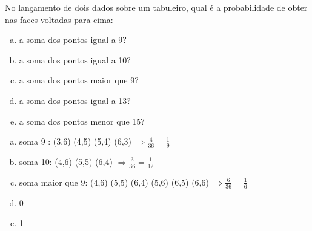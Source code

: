 \begin{ex}
No lançamento de dois dados sobre um tabuleiro, qual é a probabilidade de obter nas faces voltadas para cima:
   \begin{enumerate}[(a)]
   \item a soma dos pontos igual a 9?
   \item a soma dos pontos igual a 10?
   \item a soma dos pontos maior que 9?
   \item a soma dos pontos igual a 13?
   \item a soma dos pontos menor que 15?
   \end{enumerate}
    \begin{sol}
       \phantom{A}
       \begin{enumerate} [(a)]
           \item soma 9 : (3,6) (4,5) (5,4) (6,3) $\Longrightarrow \frac{4}{36}=\frac{1}{9}$
           \item soma 10: (4,6) (5,5) (6,4) $\Longrightarrow \frac{3}{36}=\frac{1}{12}$
           \item soma maior que 9: (4,6) (5,5) (6,4) (5,6) (6,5) (6,6) $\Longrightarrow \frac{6}{36}=\frac{1}{6}$
           \item 0
           \item 1
       \end{enumerate}
    \end{sol}
\end{ex}
